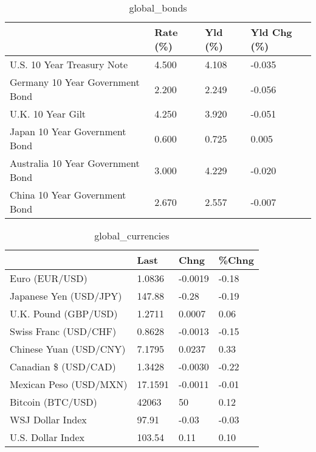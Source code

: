 \documentclass{article}%
\begin{document}
%


\begin{table}[htbp]%
\caption{global\_bonds}%
\centering%
\begin{adjustbox}{width=1\textwidth}%
\begin{tabular}{llll}
\toprule
                                  & Rate (\%) & Yld (\%) & Yld Chg (\%) \\
\midrule
       U.S. 10 Year Treasury Note &    4.500 &   4.108 &      -0.035 \\
  Germany 10 Year Government Bond &    2.200 &   2.249 &      -0.056 \\
                U.K. 10 Year Gilt &    4.250 &   3.920 &      -0.051 \\
    Japan 10 Year Government Bond &    0.600 &   0.725 &       0.005 \\
Australia 10 Year Government Bond &    3.000 &   4.229 &      -0.020 \\
    China 10 Year Government Bond &    2.670 &   2.557 &      -0.007 \\
\bottomrule
\end{tabular}
%
\end{adjustbox}%
\end{table}

%


\begin{table}[htbp]%
\caption{global\_currencies}%
\centering%
\begin{adjustbox}{width=1\textwidth}%
\begin{tabular}{llll}
\toprule
                       &    Last &    Chng & \%Chng \\
\midrule
        Euro (EUR/USD) &  1.0836 & -0.0019 & -0.18 \\
Japanese Yen (USD/JPY) &  147.88 &   -0.28 & -0.19 \\
  U.K. Pound (GBP/USD) &  1.2711 &  0.0007 &  0.06 \\
 Swiss Franc (USD/CHF) &  0.8628 & -0.0013 & -0.15 \\
Chinese Yuan (USD/CNY) &  7.1795 &  0.0237 &  0.33 \\
  Canadian \$ (USD/CAD) &  1.3428 & -0.0030 & -0.22 \\
Mexican Peso (USD/MXN) & 17.1591 & -0.0011 & -0.01 \\
     Bitcoin (BTC/USD) &   42063 &      50 &  0.12 \\
      WSJ Dollar Index &   97.91 &   -0.03 & -0.03 \\
     U.S. Dollar Index &  103.54 &    0.11 &  0.10 \\
\bottomrule
\end{tabular}
%
\end{adjustbox}%
\end{table}
\end{document}
